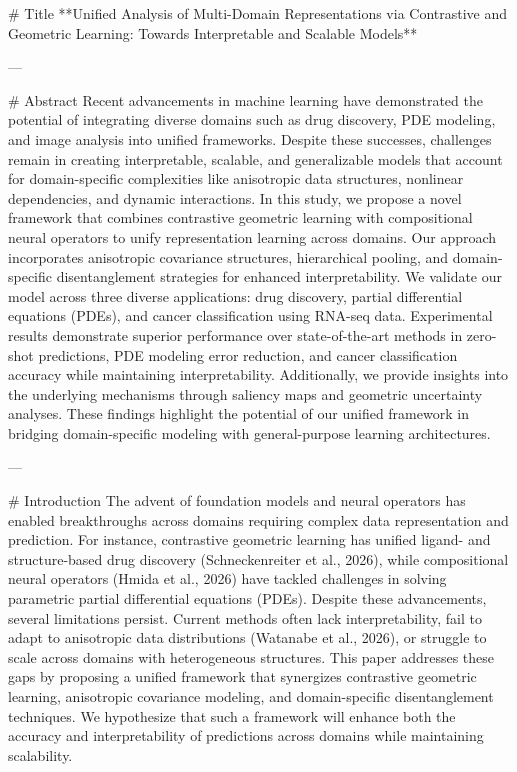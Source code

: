 # Title  
**Unified Analysis of Multi-Domain Representations via Contrastive and Geometric Learning: Towards Interpretable and Scalable Models**

---

# Abstract  
Recent advancements in machine learning have demonstrated the potential of integrating diverse domains such as drug discovery, PDE modeling, and image analysis into unified frameworks. Despite these successes, challenges remain in creating interpretable, scalable, and generalizable models that account for domain-specific complexities like anisotropic data structures, nonlinear dependencies, and dynamic interactions. In this study, we propose a novel framework that combines contrastive geometric learning with compositional neural operators to unify representation learning across domains. Our approach incorporates anisotropic covariance structures, hierarchical pooling, and domain-specific disentanglement strategies for enhanced interpretability. We validate our model across three diverse applications: drug discovery, partial differential equations (PDEs), and cancer classification using RNA-seq data. Experimental results demonstrate superior performance over state-of-the-art methods in zero-shot predictions, PDE modeling error reduction, and cancer classification accuracy while maintaining interpretability. Additionally, we provide insights into the underlying mechanisms through saliency maps and geometric uncertainty analyses. These findings highlight the potential of our unified framework in bridging domain-specific modeling with general-purpose learning architectures.

---

# Introduction  
The advent of foundation models and neural operators has enabled breakthroughs across domains requiring complex data representation and prediction. For instance, contrastive geometric learning has unified ligand- and structure-based drug discovery (Schneckenreiter et al., 2026), while compositional neural operators (Hmida et al., 2026) have tackled challenges in solving parametric partial differential equations (PDEs). Despite these advancements, several limitations persist. Current methods often lack interpretability, fail to adapt to anisotropic data distributions (Watanabe et al., 2026), or struggle to scale across domains with heterogeneous structures. This paper addresses these gaps by proposing a unified framework that synergizes contrastive geometric learning, anisotropic covariance modeling, and domain-specific disentanglement techniques. We hypothesize that such a framework will enhance both the accuracy and interpretability of predictions across domains while maintaining scalability.

